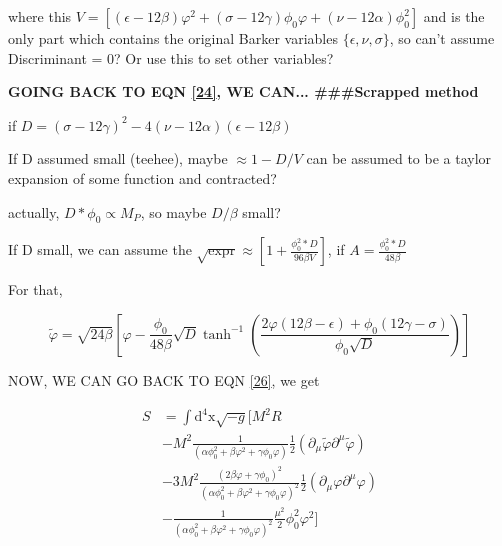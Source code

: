\documentclass{article}
\begin{document}
where this $V = [(\epsilon - 12\beta) \varphi^2 + (\sigma - 12\gamma) \phi_0 \varphi + (\nu - 12\alpha)\phi^2_0]$ and is the only part which contains the original Barker variables $\{\epsilon, \nu, \sigma \}$, so can't assume Discriminant = 0? Or use this to set other variables?


\textbf{GOING BACK TO EQN \ref{24}, WE CAN... ###Scrapped method}

if $D = (\sigma -12 \gamma )^2-4 (\nu -12 \alpha ) (\epsilon -12 \beta )$

If D assumed small (teehee), maybe $\approx 1 - D/V$ can be assumed to be a taylor expansion of some function and contracted? 

actually, $D * \phi_0 \propto M_P$, so maybe $D/\beta$ small?

If D small, we can assume the $\sqrt{\text{expr}} \approx \left[ 1 + \frac{\phi_0^2*D}{96\beta V}  \right]$, if $A = \frac{\phi_0^2*D}{48\beta}$

For that,

\begin{equation}
    \tilde{\varphi} = \sqrt{24\beta} \left[ \varphi - \frac{\phi_0}{48\beta}\sqrt{D} \tanh^{-1} \left( \frac{2\varphi (12\beta - \epsilon) + \phi_0 (12\gamma - \sigma)}{\phi_0 \sqrt{D}}\right) \right]
\end{equation}

NOW, WE CAN GO BACK TO EQN \ref{26}, we get

\begin{equation} \label{26}
    \begin{aligned}
        S &= \int \text{d}^4\text{x} \sqrt{-g} [ M^2 R \\
        &- M^2 \frac{1}{(\alpha \phi^2_0 + \beta \varphi^2 + \gamma \phi_0 \varphi)} \frac{1}{2} (\partial_\mu  \tilde{\varphi} \partial^\mu \tilde{\varphi})  \\
        &- 3 M^2 \frac{(2\beta \varphi + \gamma \phi_0)^2}{(\alpha \phi^2_0 + \beta \varphi^2 + \gamma \phi_0 \varphi)^2} \frac{1}{2}(\partial_\mu \varphi \partial^\mu \varphi)  \\
        &-  \frac{1}{(\alpha \phi^2_0 + \beta \varphi^2 + \gamma \phi_0 \varphi)^2} \frac{\mu^2}{2} \phi^2_0 \varphi^2 ] 
    \end{aligned}
\end{equation}
\end{document}
